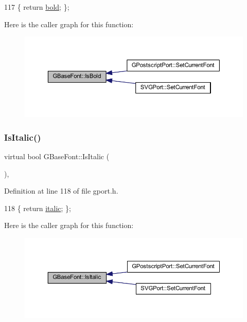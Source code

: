 \begin{DoxyCode}
117 \{ \textcolor{keywordflow}{return} \mbox{\hyperlink{class_g_base_font_a710baf8db958e41f964cb8af600df4c7}{bold}}; \};
\end{DoxyCode}
Here is the caller graph for this function\+:\nopagebreak
\begin{figure}[H]
\begin{center}
\leavevmode
\includegraphics[width=350pt]{class_g_base_font_a22abd1f8dfcda6124ffedb8dc26bfcd3_icgraph}
\end{center}
\end{figure}
\mbox{\label{class_g_base_font_aec31b5754f2be8ae2552b2bfd37a76d1}} 
\subsubsection{\texorpdfstring{Is\+Italic()}{IsItalic()}}
{\footnotesize\ttfamily virtual bool G\+Base\+Font\+::\+Is\+Italic (\begin{DoxyParamCaption}{ }\end{DoxyParamCaption})\hspace{0.3cm}{\ttfamily [inline]}, {\ttfamily [virtual]}}



Definition at line 118 of file gport.\+h.


\begin{DoxyCode}
118 \{ \textcolor{keywordflow}{return} \mbox{\hyperlink{class_g_base_font_aeff487abd13b9a9110b18a89ad51975e}{italic}}; \};    
\end{DoxyCode}
Here is the caller graph for this function\+:\nopagebreak
\begin{figure}[H]
\begin{center}
\leavevmode
\includegraphics[width=350pt]{class_g_base_font_aec31b5754f2be8ae2552b2bfd37a76d1_icgraph}
\end{center}
\end{figure}


